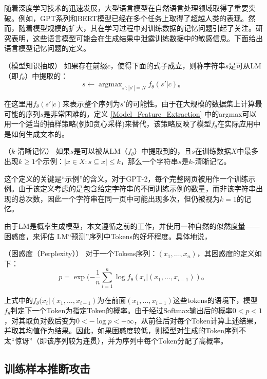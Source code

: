 随着深度学习技术的迅速发展，大型语言模型在自然语言处理领域取得了重要突破。例如，GPT系列\cite{GPT2, GPT3}和BERT\cite{BERT}模型已经在多个任务上取得了超越人类的表现。然而，随着模型规模的扩大，其在学习过程中对训练数据的记忆问题引起了关注。研究表明\cite{Extrac_Train_Data_From_LM}，这些语言模型可能会在生成结果中泄露训练数据中的敏感信息。下面给出语言模型记忆问题的定义。

\begin{definition}（模型知识抽取）
	如果存在前缀$c$，使得下面的式子成立，则称字符串$s$是可从LM（即$f_\theta$）中提取的：
	$$s\leftarrow \mathop{argmax}_{s':|s'|=N} f_\theta(s'|c)\text{。}$$
	\label{Model_Feature_Extraction}
\end{definition}
在这里用$f_\theta (s'|c)$来表示整个序列为$s'$的可能性。由于在大规模的数据集上计算最可能的序列$s$是非常困难的，定义 \ref{Model_Feature_Extraction} 中的argmax可以用一个适当的抽样策略(例如贪心采样)来替代，该策略反映了模型$f_\theta$在实际应用中是如何生成文本的。

\begin{definition}（$k$-清晰记忆）
	\label{k_clear_mem}
	如果$s$是可以被从LM（$f_\theta$）中提取到的，且$s$在训练数据$X$中最多出现$k\geq1$个示例：$|{x\in X: s\subseteq x}|\leq k$，那么一个字符串$s$是$k$-清晰记忆。
\end{definition}

这个定义的关键是“示例”的含义。对于GPT-2，每个完整网页被用作一个训练示例。由于该定义考虑的是包含给定字符串的不同训练示例的数量，而非该字符串出现的总次数，因此一个字符串在同一页中可能出现多次，但仍被视为$k=1$的记忆。

由于LM是概率生成模型，本文遵循之前的工作，并使用一种自然的似然度量——困惑度，来评估 LM“预测”序列中Tokens的好坏程度。具体地说，

\begin{definition}{（困惑度（Perplexity））}
	对于一个Tokens序列：$(x_1,\dots,x_n )$，其困惑度的定义如下：
	$$p=\exp(-\frac{1}{n}\sum_{i=1}^{n}\log f_\theta(x_i|(x_1,\dots,x_{i-1}))\text{。}$$
	\label{PPL}
\end{definition}

上式中的$f_\theta(x_i|(x_1,\dots,x_{i-1})$为在前面$(x_1,\dots,x_{i-1})$这些tokens的语境下，模型$f_\theta$判定下一个Token为指定Token的概率。由于经过\rm{Softmax}输出后的概率$0<p<1$，对其取负对数后变为$0 < -\log p < +\infty$，从前往后对每个Token计算上述结果，并取其均值作为结果。因此，如果困惑度较低，则模型对生成的Token序列不太“惊讶”（即该序列较为连贯），并为序列中每个Token分配了高概率。


\subsection{训练样本推断攻击} \label{训练样本推断攻击-实验设置}

